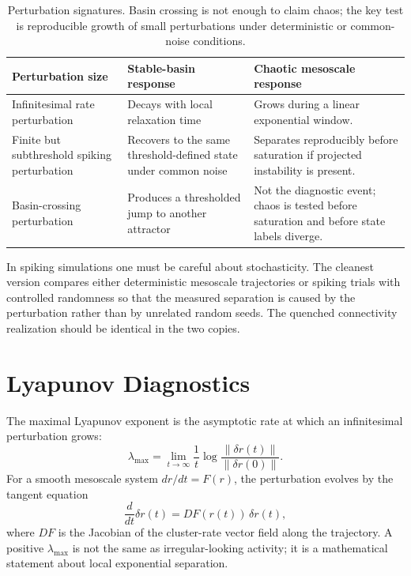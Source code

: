 \begin{table}[t]
\centering
\small
\begin{tabularx}{\textwidth}{@{}p{}p{}X@{}}
\toprule
\textbf{Perturbation size} & \textbf{Stable-basin response} & \textbf{Chaotic mesoscale response} \\
\midrule
Infinitesimal rate perturbation & Decays with local relaxation time & Grows during a linear exponential window. \\
Finite but subthreshold spiking perturbation & Recovers to the same threshold-defined state under common noise & Separates reproducibly before saturation if projected instability is present. \\
Basin-crossing perturbation & Produces a thresholded jump to another attractor & Not the diagnostic event; chaos is tested before saturation and before state labels diverge. \\
\bottomrule
\end{tabularx}
\caption{Perturbation signatures. Basin crossing is not enough to claim chaos;
the key test is reproducible growth of small perturbations under deterministic
or common-noise conditions.}
\label{tab:ch09-perturbation-signatures}
\end{table}

In spiking simulations one must be careful about stochasticity. The cleanest
version compares either deterministic mesoscale trajectories or spiking trials
with controlled randomness so that the measured separation is caused by the
perturbation rather than by unrelated random seeds. The quenched connectivity
realization should be identical in the two copies.

\section{Lyapunov Diagnostics}
\label{sec:ch09-lyapunov-diagnostics}

The maximal Lyapunov exponent is the asymptotic rate at which an infinitesimal
perturbation grows:
\begin{equation}
    \lambda_{\max}
    =
    \lim_{t\to\infty}
    \frac{1}{t}
    \log
    \frac{\|\delta r(t)\|}{\|\delta r(0)\|}.
    \label{eq:ch09-lyapunov}
\end{equation}
For a smooth mesoscale system \(dr/dt=F(r)\), the perturbation evolves by the
tangent equation
\begin{equation}
    \frac{d}{dt}\delta r(t)
    =
    D F(r(t))\,\delta r(t),
    \label{eq:ch09-tangent-equation}
\end{equation}
where \(D F\) is the Jacobian of the cluster-rate vector field along the
trajectory. A positive \(\lambda_{\max}\) is not the same as irregular-looking
activity; it is a mathematical statement about local exponential separation.

